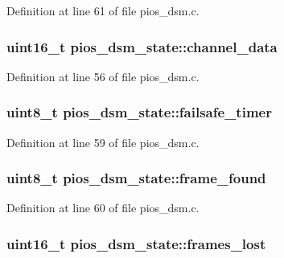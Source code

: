 \-Definition at line 61 of file pios\-\_\-dsm.\-c.

\hypertarget{structpios__dsm__state_aade4ea4a4eb46a6e63db80e6f4c55b11}{
\subsubsection[{channel\-\_\-data}]{\setlength{\rightskip}{0pt plus 5cm}uint16\-\_\-t {\bf pios\-\_\-dsm\-\_\-state\-::channel\-\_\-data}}}\label{structpios__dsm__state_aade4ea4a4eb46a6e63db80e6f4c55b11}


\-Definition at line 56 of file pios\-\_\-dsm.\-c.

\hypertarget{structpios__dsm__state_a70f387f5d5e82231a14003705b43fb59}{
\subsubsection[{failsafe\-\_\-timer}]{\setlength{\rightskip}{0pt plus 5cm}uint8\-\_\-t {\bf pios\-\_\-dsm\-\_\-state\-::failsafe\-\_\-timer}}}\label{structpios__dsm__state_a70f387f5d5e82231a14003705b43fb59}


\-Definition at line 59 of file pios\-\_\-dsm.\-c.

\hypertarget{structpios__dsm__state_a6d1e951d9c03ec9651104491b4ad9b1a}{
\subsubsection[{frame\-\_\-found}]{\setlength{\rightskip}{0pt plus 5cm}uint8\-\_\-t {\bf pios\-\_\-dsm\-\_\-state\-::frame\-\_\-found}}}\label{structpios__dsm__state_a6d1e951d9c03ec9651104491b4ad9b1a}


\-Definition at line 60 of file pios\-\_\-dsm.\-c.

\hypertarget{structpios__dsm__state_ae3dfacd2e0da0bc8b4503054f854bfcc}{
\subsubsection[{frames\-\_\-lost}]{\setlength{\rightskip}{0pt plus 5cm}uint16\-\_\-t {\bf pios\-\_\-dsm\-\_\-state\-::frames\-\_\-lost}}}\label{structpios__dsm__state_ae3dfacd2e0da0bc8b4503054f854bfcc}


